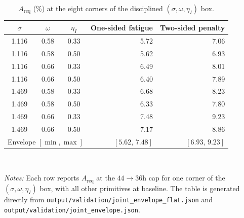\begin{table}[htbp]
\centering
\caption{$A_{\text{req}}$ (\%) at the eight corners of the disciplined $(\sigma,\omega,\eta_I)$ box.}\label{tab:envelope_corners}
\small
\begin{tabular}{cccrr}
\hline\hline
$\sigma$ & $\omega$ & $\eta_I$ & One-sided fatigue & Two-sided penalty \\
\hline
1.116 & 0.58 & 0.33 & 5.72 & 7.06 \\
1.116 & 0.58 & 0.50 & 5.62 & 6.93 \\
1.116 & 0.66 & 0.33 & 6.49 & 8.01 \\
1.116 & 0.66 & 0.50 & 6.40 & 7.89 \\
1.469 & 0.58 & 0.33 & 6.68 & 8.23 \\
1.469 & 0.58 & 0.50 & 6.33 & 7.80 \\
1.469 & 0.66 & 0.33 & 7.48 & 9.23 \\
1.469 & 0.66 & 0.50 & 7.17 & 8.86 \\
\hline
\multicolumn{3}{l}{Envelope $[\min,\max]$} & $[5.62,\,7.48]$ & $[6.93,\,9.23]$ \\
\hline\hline
\end{tabular}
\\[2pt]
\begin{minipage}{0.95\textwidth}
\justifying
{\footnotesize \textit{Notes:} Each row reports $A_{\text{req}}$ at the $44\to 36$h cap for one corner of the $(\sigma,\omega,\eta_I)$ box, with all other primitives at baseline. The table is generated directly from \texttt{output/validation/joint\_envelope\_flat.json} and \texttt{output/validation/joint\_envelope.json}.}
\end{minipage}
\end{table}
